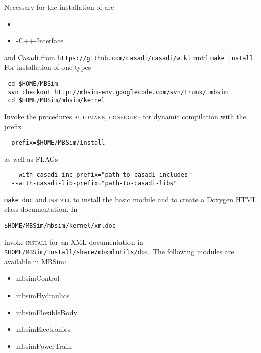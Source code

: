 \subsubsection{\MBSim}
Necessary for the installation of \MBSim{} are
\begin{itemize}
\item \FMatVec{}
\item \OpenMBV{}-C++-Interface
\end{itemize}
and Casadi from \texttt{https://github.com/casadi/casadi/wiki} until \texttt{make install}. For installation of \MBSim{} one types
\begin{verbatim}
 cd $HOME/MBSim
 svn checkout http://mbsim-env.googlecode.com/svn/trunk/ mbsim
 cd $HOME/MBSim/mbsim/kernel
\end{verbatim}
Invoke the procedures \textsc{automake, configure} for dynamic compilation with the prefix
\begin{verbatim}
--prefix=$HOME/MBSim/Install
\end{verbatim}
as well as FLAGs 
\begin{verbatim}
  --with-casadi-inc-prefix="path-to-casadi-includes"
  --with-casadi-lib-prefix="path-to-casadi-libs"
\end{verbatim}
\texttt{make doc} and \textsc{install} to install the basic module and to create a Doxygen HTML class documentation. In
\begin{verbatim}
$HOME/MBSim/mbsim/kernel/xmldoc
\end{verbatim}
invoke \textsc{install} for an XML documentation in \texttt{\$HOME/MBSim/Install/share/mbxmlutils/doc}.\vspace{5mm}
The following modules are available in MBSim:
\begin{itemize}
\item mbsimControl
\item mbsimHydraulics
\item mbsimFlexibleBody
\item mbsimElectronics
\item mbsimPowerTrain
\end{itemize}

